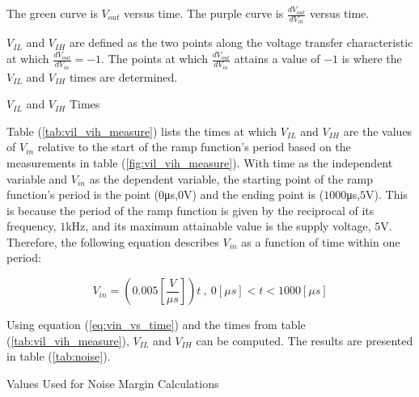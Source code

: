 \FloatBarrier

{\footnotesize The green curve is $V_{out}$ versus time. The purple curve is $\frac{dV_{out}}{dV_{in}}$ versus time.}

\FloatBarrier

$V_{IL}$ and $V_{IH}$ are defined as the two points along the voltage transfer characteristic at which $\frac{dV_{out}}{dV_{in}} = -1$.
The points at which $\frac{dV_{out}}{dV_{in}}$ attains a value of $-1$ is where the $V_{IL}$ and $V_{IH}$ times are determined.

\FloatBarrier

\begin{table}[h!]
	\centering
	\caption{$V_{IL}$ and $V_{IH}$ Times}
	\label{tab:vil_vih_measure}
\end{table}

\FloatBarrier

Table (\ref{tab:vil_vih_measure}) lists the times at which $V_{IL}$ and $V_{IH}$ are the values of $V_{in}$ relative to the start of the ramp function's period based on the measurements in table (\ref{fig:vil_vih_measure}).
With time as the independent variable and $V_{in}$ as the dependent variable, the starting point of the ramp function's period is the point ($0$\si{\micro\second},$0$\si{\volt}) and the ending point is ($1000$\si{\micro\second},$5$\si{\volt}).
This is because the period of the ramp function is given by the reciprocal of its frequency, $1$\si{\kilo\hertz}, and its maximum attainable value is the supply voltage, $5$\si{\volt}.
Therefore, the following equation describes $V_{in}$ as a function of time within one period:

\begin{equation}
	\label{eq:vin_vs_time}
	V_{in} = (0.005[\frac{V}{\mu s}])t \ , \ 0[\mu s] < t < 1000[\mu s]
\end{equation}

Using equation (\ref{eq:vin_vs_time}) and the times from table (\ref{tab:vil_vih_measure}), $V_{IL}$ and $V_{IH}$ can be computed.
The results are presented in table (\ref{tab:noise}).

\FloatBarrier

\begin{table}[h!]
	\centering
	\caption{Values Used for Noise Margin Calculations}
	\label{tab:noise}
\end{table}

\FloatBarrier


